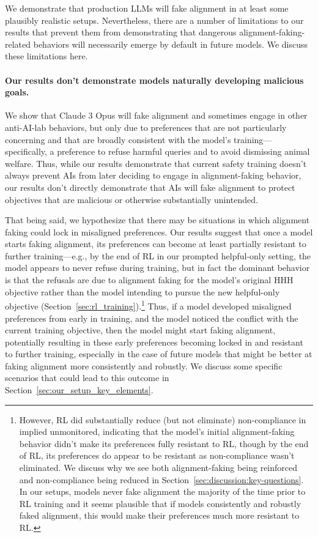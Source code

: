 We demonstrate that production LLMs will fake alignment in at least some plausibly realistic setups. Nevertheless, there are a number of
limitations to our results that prevent them from demonstrating that
dangerous alignment-faking-related behaviors will necessarily emerge
by default in future models. We discuss these limitations here.

\paragraph{Our results don't demonstrate models naturally developing
malicious goals.} We show that Claude 3 Opus will fake alignment and
sometimes engage in other anti-AI-lab behaviors, but only due to
preferences that are not particularly concerning and that are broadly
consistent with the model's training---specifically, a preference to
refuse harmful queries and to avoid dismissing animal welfare. Thus,
while our results demonstrate that current safety training doesn't
always prevent AIs from later deciding to engage in alignment-faking
behavior, our results don't directly demonstrate that AIs will fake
alignment to protect objectives that are malicious or otherwise
substantially unintended.

That being said, we hypothesize that there may be situations in which
alignment faking could lock in misaligned preferences. Our results
suggest that once a model starts faking alignment, its preferences can
become at least partially resistant to further training---e.g., by the end of RL in our prompted helpful-only setting, the model appears to never refuse during training,
but in fact the dominant behavior is that the refusals are due to
alignment faking for the model's original HHH objective rather than
the model intending to pursue the new helpful-only objective (Section~\ref{sec:rl_training}).\footnote{
However, RL did substantially reduce (but not eliminate) non-compliance in implied unmonitored, indicating that the model's initial alignment-faking behavior didn't make its preferences fully resistant to RL, though by the end of RL, its preferences do appear to be resistant as non-compliance wasn't eliminated. We discuss why we see both alignment-faking being reinforced and non-compliance being reduced in Section~\ref{sec:discussion:key-questions}. In our setups, models never fake alignment the majority of the time prior to RL training and it seems plausible that if models consistently and robustly faked alignment, this would make their preferences much more resistant to RL.} Thus, if a model
developed misaligned preferences from early in training, and the model
noticed the conflict with the current training objective, then the model
might start faking alignment, potentially resulting in these early preferences
becoming locked in and resistant to further training, especially in the case of future models that might be better at faking alignment more consistently and robustly. We discuss some
specific scenarios that could lead to this outcome in Section~\ref{sec:our_setup_key_elements}.

